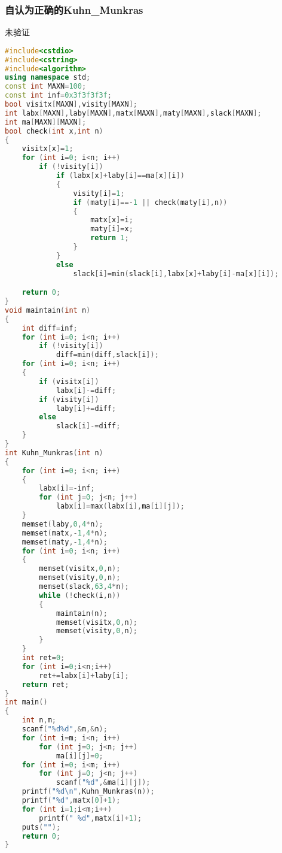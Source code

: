     \subsubsection{自认为正确的Kuhn\_Munkras}
    未验证
	\begin{lstlisting}[language=c++]
#include<cstdio>
#include<cstring>
#include<algorithm>
using namespace std;
const int MAXN=100;
const int inf=0x3f3f3f3f;
bool visitx[MAXN],visity[MAXN];
int labx[MAXN],laby[MAXN],matx[MAXN],maty[MAXN],slack[MAXN];
int ma[MAXN][MAXN];
bool check(int x,int n)
{
    visitx[x]=1;
    for (int i=0; i<n; i++)
        if (!visity[i])
            if (labx[x]+laby[i]==ma[x][i])
            {
                visity[i]=1;
                if (maty[i]==-1 || check(maty[i],n))
                {
                    matx[x]=i;
                    maty[i]=x;
                    return 1;
                }
            }
            else
                slack[i]=min(slack[i],labx[x]+laby[i]-ma[x][i]);

    return 0;
}
void maintain(int n)
{
    int diff=inf;
    for (int i=0; i<n; i++)
        if (!visity[i])
            diff=min(diff,slack[i]);
    for (int i=0; i<n; i++)
    {
        if (visitx[i])
            labx[i]-=diff;
        if (visity[i])
            laby[i]+=diff;
        else
            slack[i]-=diff;
    }
}
int Kuhn_Munkras(int n)
{
    for (int i=0; i<n; i++)
    {
        labx[i]=-inf;
        for (int j=0; j<n; j++)
            labx[i]=max(labx[i],ma[i][j]);
    }
    memset(laby,0,4*n);
    memset(matx,-1,4*n);
    memset(maty,-1,4*n);
    for (int i=0; i<n; i++)
    {
        memset(visitx,0,n);
        memset(visity,0,n);
        memset(slack,63,4*n);
        while (!check(i,n))
        {
            maintain(n);
            memset(visitx,0,n);
            memset(visity,0,n);
        }
    }
    int ret=0;
    for (int i=0;i<n;i++)
        ret+=labx[i]+laby[i];
    return ret;
}
int main()
{
    int n,m;
    scanf("%d%d",&m,&n);
    for (int i=m; i<n; i++)
        for (int j=0; j<n; j++)
            ma[i][j]=0;
    for (int i=0; i<m; i++)
        for (int j=0; j<n; j++)
            scanf("%d",&ma[i][j]);
    printf("%d\n",Kuhn_Munkras(n));
    printf("%d",matx[0]+1);
    for (int i=1;i<m;i++)
        printf(" %d",matx[i]+1);
    puts("");
    return 0;
}
	\end{lstlisting}